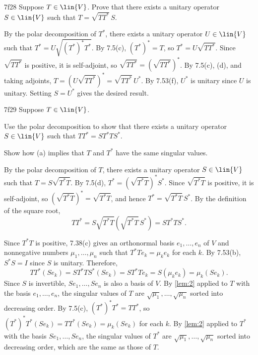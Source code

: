 \begin{exercise}{7f28}
    Suppose $T \in \lin{V}$.
    Prove that there exists a unitary operator $S \in \lin{V}$ such that $T = \sqrt{TT^\ast}\, S$.
\end{exercise}

\begin{sol}
    By the polar decomposition of $T^\ast$, there exists a unitary operator $U \in \lin{V}$ such that $T^\ast = U\sqrt{(T^\ast)^\ast T^\ast}$.
    By 7.5(c), $(T^\ast)^\ast = T$, so $T^\ast = U\sqrt{TT^\ast}$.
    Since $\sqrt{TT^\ast}$ is positive, it is self-adjoint, so $\sqrt{TT^\ast} = (\sqrt{TT^\ast})^\ast$.
    By 7.5(c), (d), and taking adjoints, $T = (U \sqrt{TT^\ast})^\ast = \sqrt{TT^\ast}\, U^\ast$.
    By 7.53(f), $U^\ast$ is unitary since $U$ is unitary.
    Setting $S = U^\ast$ gives the desired result.
\end{sol}

\begin{exercise}{7f29}
    Suppose $T \in \lin{V}$.
    \begin{subexercises}
        \item Use the polar decomposition to show that there exists a unitary operator $S \in \lin{V}$ such that $TT^\ast = ST^\ast TS^\ast$.
        \item Show how (a) implies that $T$ and $T^\ast$ have the same singular values.
    \end{subexercises}
\end{exercise}

\begin{solenum}
    \item By the polar decomposition of $T$, there exists a unitary operator $S \in \lin{V}$ such that $T = S\sqrt{T^\ast T}$.
    By 7.5(d), $T^\ast = (\sqrt{T^\ast T})^\ast S^\ast$.
    Since $\sqrt{T^\ast T}$ is positive, it is self-adjoint, so $(\sqrt{T^\ast T})^\ast = \sqrt{T^\ast T}$, and hence $T^\ast = \sqrt{T^\ast T}\, S^\ast$.
    By the definition of the square root,
    \[
        TT^\ast = S\sqrt{T^\ast T} \left(\sqrt{T^\ast T}\, S^\ast\right) = S T^\ast T S^\ast.
    \]
    \item Since $T^\ast T$ is positive, 7.38(c) gives an orthonormal basis $e_1, \ldots, e_n$ of $V$ and nonnegative numbers $\mu_1, \ldots, \mu_n$ such that $T^\ast T e_k = \mu_k e_k$ for each $k$.
    By 7.53(b), $S^\ast S = I$ since $S$ is unitary.
    Therefore,
    \[
        TT^\ast (S e_k) = S T^\ast T S^\ast (S e_k) = S T^\ast T e_k = S (\mu_k e_k) = \mu_k (S e_k).
    \]
    Since $S$ is invertible, $S e_1, \ldots, S e_n$ is also a basis of $V$.
    By \autoref{lem:2} applied to $T$ with the basis $e_1, \ldots, e_n$, the singular values of $T$ are $\sqrt{\mu_1}, \ldots, \sqrt{\mu_n}$ sorted into decreasing order.
    By 7.5(c), $(T^\ast)^\ast T^\ast = TT^\ast$, so $(T^\ast)^\ast T^\ast (S e_k) = TT^\ast (S e_k) = \mu_k (S e_k)$ for each $k$.
    By \autoref{lem:2} applied to $T^\ast$ with the basis $S e_1, \ldots, S e_n$, the singular values of $T^\ast$ are $\sqrt{\mu_1}, \ldots, \sqrt{\mu_n}$ sorted into decreasing order, which are the same as those of $T$.
\end{solenum}

